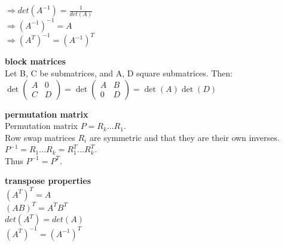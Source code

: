 \documentclass[10pt,landscape]{scrartcl}
\newcommand{\sect}[1]{\vspace{1mm}\textbf{#1}\\}
\begin{document}
\begin{multicols}{3}
\smallbreak
$\Rightarrow det(A^{-1}) = \frac{1}{det(A)}$\\
$\Rightarrow (A^{-1})^{-1} = A$\\
$\Rightarrow (A^{T})^{-1} = (A^{-1})^{T}$

\sect{block matrices}
Let B, C be submatrices, and A, D square submatrices. Then:\\
$\det\begin{pmatrix}A& 0\\ C& D\end{pmatrix} = \det\begin{pmatrix}A& B\\ 0& D\end{pmatrix} = \det(A) \det(D)$

\sect{permutation matrix}
Permutation matrix $P = R_{k} \dots R_{1}$.\\
Row swap matrices $R_{i}$ are symmetric and that they are their own inverses.\\
$P^{-1} = R_{1} \dots R_{k} = R_{1}^{T} \dots R_{k}^{T}$.\\
Thus $P^{-1} = P^{T}$.

\sect{transpose properties}
$(A^T)^T = A$\\
$(AB)^T = A^TB^T$\\
$det(A^T) = det(A)$\\
$(A^T)^{-1} = (A^{-1})^T$


\end{multicols}
\end{document}
